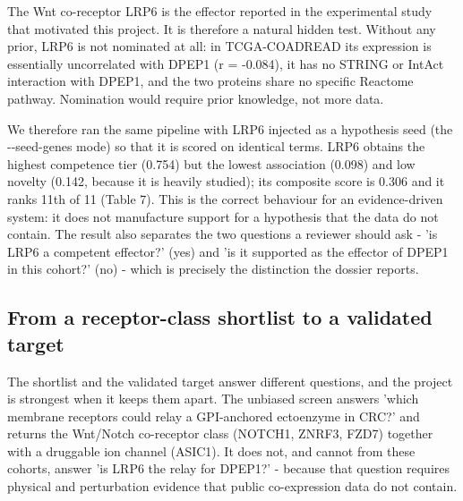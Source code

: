 The Wnt co-receptor LRP6 is the effector reported in the experimental study that motivated this project. It is therefore a natural hidden test. Without any prior, LRP6 is not nominated at all: in TCGA-COADREAD its expression is essentially uncorrelated with DPEP1 (r = -0.084), it has no STRING or IntAct interaction with DPEP1, and the two proteins share no specific Reactome pathway. Nomination would require prior knowledge, not more data.

We therefore ran the same pipeline with LRP6 injected as a hypothesis seed (the -{}-seed-genes mode) so that it is scored on identical terms. LRP6 obtains the highest competence tier (0.754) but the lowest association (0.098) and low novelty (0.142, because it is heavily studied); its composite score is 0.306 and it ranks 11th of 11 (Table 7). This is the correct behaviour for an evidence-driven system: it does not manufacture support for a hypothesis that the data do not contain. The result also separates the two questions a reviewer should ask - 'is LRP6 a competent effector?' (yes) and 'is it supported as the effector of DPEP1 in this cohort?' (no) - which is precisely the distinction the dossier reports.

\begin{table}[htbp]
\centering
\small
\caption{LRP6 hindcast. Data-driven channels do not nominate LRP6; when scored as a hypothesis it is competent but poorly associated.}
\end{table}

\subsection{From a receptor-class shortlist to a validated target}

The shortlist and the validated target answer different questions, and the project is strongest when it keeps them apart. The unbiased screen answers 'which membrane receptors could relay a GPI-anchored ectoenzyme in CRC?' and returns the Wnt/Notch co-receptor class (NOTCH1, ZNRF3, FZD7) together with a druggable ion channel (ASIC1). It does not, and cannot from these cohorts, answer 'is LRP6 the relay for DPEP1?' - because that question requires physical and perturbation evidence that public co-expression data do not contain.

